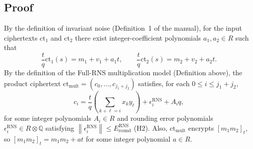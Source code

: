 \documentclass[11pt]{article}
\newcommand{\norm}[1]{\left\lVert #1\right\rVert}
\newcommand{\ct}{\mathrm{ct}}
\newcommand{\ctmult}{\mathrm{ct}_{\mathrm{mult}}}
\theoremstyle{plain}
\theoremstyle{definition}
\theoremstyle{remark}
\begin{document}
\subsection{Proof}

By the definition of invariant noise (Definition~1 of the manual), for the input ciphertexts
$\ct_1$ and $\ct_2$ there exist integer-coefficient polynomials $a_1, a_2\in R$ such that
\begin{equation}
 \frac{t}{q}\ct_1(s)=m_1+v_1+a_1t,\qquad
 \frac{t}{q}\ct_2(s)=m_2+v_2+a_2t.
 \label{eq:mult-inputs-noise}
\end{equation}
By the definition of the Full-RNS multiplication model (Definition above), the product ciphertext
$\ctmult=(c_0,\ldots,c_{j_1+j_2})$ satisfies, for each $0\leq i\leq j_1+j_2$,
\[
 c_i = \frac{t}{q}\left(\sum_{k+\ell=i}x_ky_\ell\right) + \epsilon_i^{\mathrm{RNS}} + A_iq ,
\]
for some integer polynomials $A_i\in R$ and rounding error polynomials $\epsilon_i^{\mathrm{RNS}}\in R\otimes\mathbb{Q}$
satisfying $\norm{\epsilon_i^{\mathrm{RNS}}}\leq E_{\mathrm{round}}^{\mathrm{RNS}}$ (H2).
Also, $\ctmult$ encrypts $[m_1m_2]_t$, so $[m_1m_2]_t = m_1m_2+at$ for some integer polynomial $a\in R$.
\end{document}

